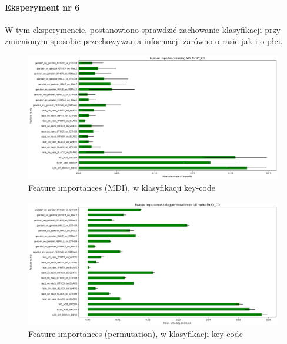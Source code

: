 \documentclass{classrep}
\begin{document}
{{{                    \paragraph{Eksperyment nr 6}{
                    W tym eksperymencie, postanowiono sprawdzić zachowanie klasyfikacji przy zmienionym sposobie przechowywania informacji zarówno o rasie jak i o płci.
                    \begin{figure}[!htbp]
                        \centering
                        \includegraphics[width=\textwidth]{img/5.1.3/6/Feature importances using MDI for KY_CD.png}
                        \caption{Feature importances (MDI), w klasyfikacji key-code}
                        \label{goal_1_exp_6_imp_mdi_key}
                    \end{figure}
                    
                    \begin{figure}[!htbp]
                        \centering
                        \includegraphics[width=\textwidth]{img/5.1.3/6/Feature importances using permutation on full model for KY_CD.png}
                        \caption{Feature importances (permutation), w klasyfikacji key-code}
                        \label{goal_1_exp_6_imp_perm_key}
                    \end{figure}
                    
}}}}
\end{document}
